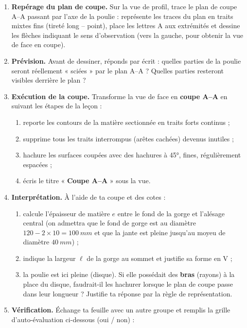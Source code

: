 \documentclass[11pt]{article}
\newcommand{\cle}[1]{{\popxbold\color{popdark}#1}}
\begin{document}
\begin{enumerate}
\item \textbf{Repérage du plan de coupe.} Sur la vue de profil, trace le plan de coupe A--A passant par l'axe de la poulie : représente les traces du plan en \cle{traits mixtes fins} (tireté long -- point), place les lettres A aux extrémités et dessine les \cle{flèches} indiquant le sens d'observation (vers la gauche, pour obtenir la vue de face en coupe).
\item \textbf{Prévision.} Avant de dessiner, réponds par écrit : quelles parties de la poulie seront réellement « sciées » par le plan A--A ? Quelles parties resteront visibles derrière le plan ?
\item \textbf{Exécution de la coupe.} Transforme la vue de face en \textbf{coupe A--A} en suivant les étapes de la leçon :
\begin{enumerate}
\item reporte les contours de la matière sectionnée en \cle{traits forts continus} ;
\item supprime tous les \cle{traits interrompus} (arêtes cachées) devenus inutiles ;
\item hachure les surfaces coupées avec des \cle{hachures à 45°}, fines, régulièrement espacées ;
\item écris le titre « \textbf{Coupe A--A} » sous la vue.
\end{enumerate}
\item \textbf{Interprétation.} À l'aide de ta coupe et des cotes :
\begin{enumerate}
\item calcule l'épaisseur de matière $e$ entre le fond de la gorge et l'alésage central (on admettra que le fond de gorge est au diamètre $120 - 2\times 10 = \SI{100}{mm}$ et que la jante est pleine jusqu'au moyeu de diamètre $\SI{40}{mm}$) ;
\item indique la largeur $\ell$ de la gorge au sommet et justifie sa forme en V ;
\item la poulie est ici pleine (disque). Si elle possédait des \textbf{bras} (rayons) à la place du disque, faudrait-il les hachurer lorsque le plan de coupe passe dans leur longueur ? Justifie ta réponse par la règle de représentation.
\end{enumerate}
\item \textbf{Vérification.} Échange ta feuille avec un autre groupe et remplis la grille d'auto-évaluation ci-dessous (oui / non) :
\begin{center}
\begin{tabularx}{\linewidth}{|X|c|}

\end{tabularx}
\end{center}
\end{enumerate}
\end{document}
